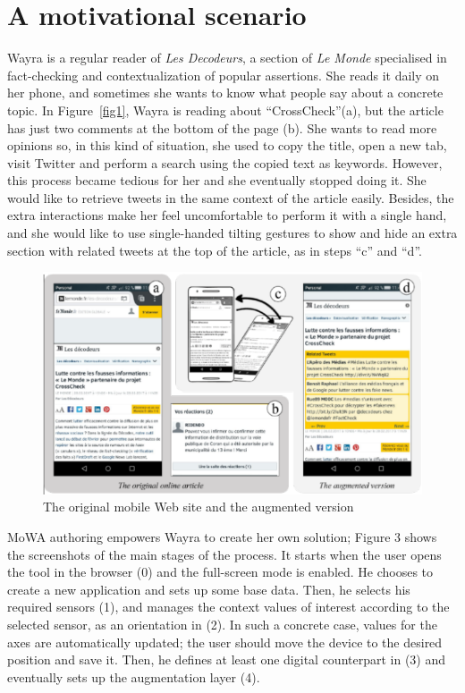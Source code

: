 \documentclass[runningheads]{llncs}
\begin{document}
\section{A motivational scenario}
Wayra is a regular reader of \textit{Les Decodeurs}, a section of \textit{Le Monde} specialised in fact-checking and contextualization of popular assertions. She reads it daily on her phone, and sometimes she wants to know what people say about a concrete topic. In Figure~\ref{fig1}, Wayra is reading about “CrossCheck”(a), but the article has just two comments at the bottom of the page (b). She wants to read more opinions so, in this kind of situation, she used to copy the title, open a new tab, visit Twitter and perform a search using the copied text as keywords. However, this process became tedious for her and she eventually stopped doing it. She would like to retrieve tweets in the same context of the article easily. Besides, the extra interactions make her feel uncomfortable to perform it with a single hand, and she would like to use single-handed tilting gestures to show and hide an extra section with related tweets at the top of the article, as in steps “c” and “d”.

\begin{figure}
\includegraphics[width=\textwidth]{fig2.png}
\caption{The original mobile Web site and the augmented version} \label{fig2}
\end{figure}

MoWA authoring empowers Wayra to create her own solution; Figure 3 shows the screenshots of the main stages of the process. It starts when the user opens the tool in the browser (0) and the full-screen mode is enabled. He chooses to create a new application and sets up some base data. Then, he selects his required sensors (1), and manages the context values of interest according to the selected sensor, as an orientation in (2). In such a concrete case, values for the axes are automatically updated; the user should move the device to the desired position and save it. Then, he defines at least one digital counterpart in (3) and eventually sets up the augmentation layer (4).
\end{document}
